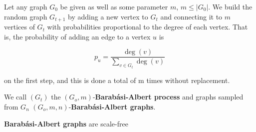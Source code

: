 \begin{definition}
  Let any graph $G_0$ be given as well as some parameter $m$, $m \leq |G_0|$. We
  build the random graph $G_{t+1}$ by adding a new vertex to $G_t$ and
  connecting it to $m$ vertices of $G_t$ with probabilities proportional to the
  degree of each vertex. That is, the probability of adding an edge to a vertex
  $u$ is

  \[
    p_u = \frac{\deg(v)}{\sum_{v \in G_t} \deg(v)}
  \]

  on the first step, and this is done a total of m times without replacement.

  We call $(G_t)$ the $(G_o,m)$-\textbf{Barab\'asi-Albert process} and graphs sampled
  from $G_n$ $(G_o,m,n)$-\textbf{Barab\'asi-Albert graphs}.
\end{definition}

\begin{theorem}
  \textbf{Barab\'asi-Albert graphs} are scale-free
\end{theorem}


